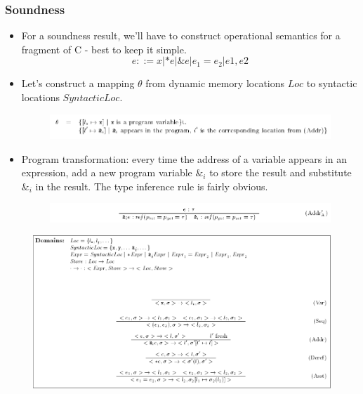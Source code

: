 \documentclass{beamer}
\begin{document}
\begin{frame}[allowframebreaks]
  \frametitle{Soundness}

  \begin{itemize}
  \item For a soundness result, we'll have to construct operational
    semantics for a fragment of C - best to keep it simple.
    $$ e ::= x | *e | \& e | e_1 = e_2 | e1,e2 $$
  \item Let's construct a mapping $\theta$ from dynamic memory
    locations $Loc$ to syntactic locations $SyntacticLoc$.
    \begin{figure}
      \centering
      \includegraphics[scale=0.3]{theta.png}
    \end{figure}
  \item Program transformation: every time the address of a variable
    appears in an expression, add a new program variable $\&_i$ to
    store the result and substitute $\&_i$ in the result. The type
    inference rule is fairly obvious.
    \begin{figure}
      \centering
      \includegraphics[scale=0.3]{theta_inference_rule.png}
    \end{figure}
  \end{itemize}

  \begin{figure}
    \centering
    \includegraphics[scale=0.3]{operational_semantics.png}
  \end{figure}
\end{frame}
\end{document}
